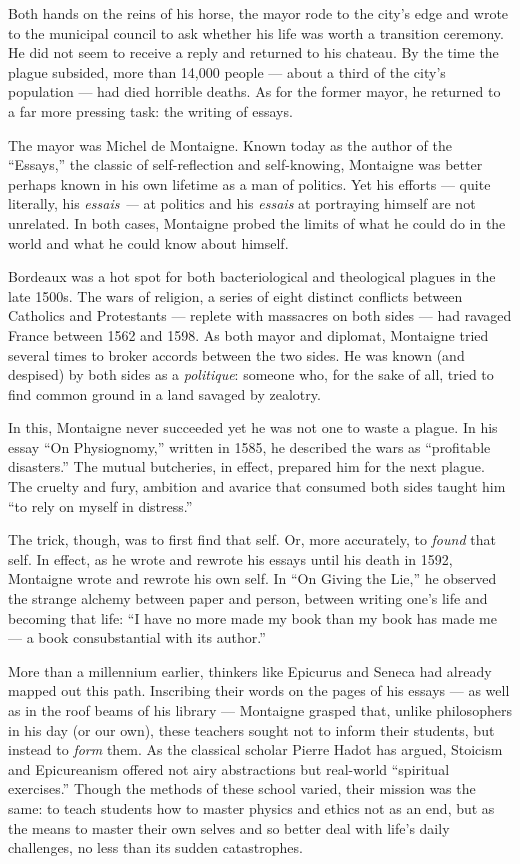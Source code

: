 Both hands on the reins of his horse, the mayor rode to the city's edge
and wrote to the municipal council to ask whether his life was worth a
transition ceremony. He did not seem to receive a reply and returned to
his chateau. By the time the plague subsided, more than 14,000 people
--- about a third of the city's population --- had died horrible deaths.
As for the former mayor, he returned to a far more pressing task: the
writing of essays.

The mayor was Michel de Montaigne. Known today as the author of the
``Essays,'' the classic of self-reflection and self-knowing, Montaigne
was better perhaps known in his own lifetime as a man of politics. Yet
his efforts --- quite literally, his \emph{essais ---} at politics and
his \emph{essais} at portraying himself are not unrelated. In both
cases, Montaigne probed the limits of what he could do in the world and
what he could know about himself.

Bordeaux was a hot spot for both bacteriological and theological plagues
in the late 1500s. The wars of religion, a series of eight distinct
conflicts between Catholics and Protestants --- replete with massacres
on both sides --- had ravaged France between 1562 and 1598. As both
mayor and diplomat, Montaigne tried several times to broker accords
between the two sides. He was known (and despised) by both sides as a
\emph{politique}: someone who, for the sake of all, tried to find common
ground in a land savaged by zealotry.

In this, Montaigne never succeeded yet he was not one to waste a plague.
In his essay ``On Physiognomy,'' written in 1585, he described the wars
as ``profitable disasters.'' The mutual butcheries, in effect, prepared
him for the next plague. The cruelty and fury, ambition and avarice that
consumed both sides taught him ``to rely on myself in distress.''

The trick, though, was to first find that self. Or, more accurately, to
\emph{found} that self. In effect, as he wrote and rewrote his essays
until his death in 1592, Montaigne wrote and rewrote his own self. In
``On Giving the Lie,'' he observed the strange alchemy between paper and
person, between writing one's life and becoming that life: ``I have no
more made my book than my book has made me --- a book consubstantial
with its author.''

More than a millennium earlier, thinkers like Epicurus and Seneca had
already mapped out this path. Inscribing their words on the pages of his
essays --- as well as in the roof beams of his library --- Montaigne
grasped that, unlike philosophers in his day (or our own), these
teachers sought not to inform their students, but instead to \emph{form}
them. As the classical scholar Pierre Hadot has argued, Stoicism and
Epicureanism offered not airy abstractions but real-world ``spiritual
exercises.'' Though the methods of these school varied, their mission
was the same: to teach students how to master physics and ethics not as
an end, but as the means to master their own selves and so better deal
with life's daily challenges, no less than its sudden catastrophes.

